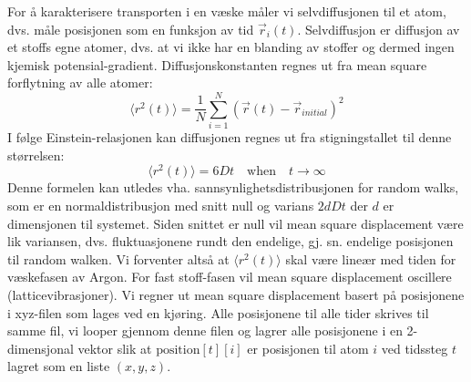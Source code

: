 \documentclass[english, a4paper]{article}
\begin{document}
\noindent
For å karakterisere transporten i en væske måler vi selvdiffusjonen til et atom, 
dvs. måle posisjonen som en funksjon av tid $\vec{r}_i(t)$. Selvdiffusjon er diffusjon av et stoffs
egne atomer, dvs. at vi ikke har en blanding av stoffer og dermed ingen kjemisk potensial-gradient.
Diffusjonskonstanten
regnes ut fra mean square forflytning av alle atomer:
\begin{equation}
 \langle r^2(t) \rangle = \frac{1}{N}\sum_{i=1}^N (\vec{r}(t) - \vec{r}_{initial})^2
\end{equation}
I følge Einstein-relasjonen kan diffusjonen regnes ut fra stigningstallet til denne størrelsen:
\begin{equation}
 \langle r^2(t) \rangle = 6Dt \quad \textrm{when} \quad t \rightarrow \infty
\end{equation}
Denne formelen kan utledes vha. sannsynlighetsdistribusjonen for random walks, som er 
en normaldistribusjon med snitt null og varians $2dDt$ der $d$ er dimensjonen til systemet. 
Siden snittet er null vil mean square displacement være lik variansen, dvs. fluktuasjonene
rundt den endelige, gj. sn. endelige posisjonen til random walken. 
Vi forventer altså at $\langle r^2(t) \rangle$ skal være lineær med tiden for væskefasen av Argon.
For fast stoff-fasen vil mean square displacement oscillere (latticevibrasjoner).
Vi regner ut mean square displacement basert på posisjonene i xyz-filen som lages ved en kjøring.
Alle posisjonene til alle tider skrives til samme fil, vi looper gjennom denne filen og lagrer alle posisjonene i 
en 2-dimensjonal vektor slik at $\textrm{position}[t][i]$ er posisjonen til atom $i$ ved tidssteg $t$ lagret
som en liste $(x,y,z)$. \\
\end{document}
